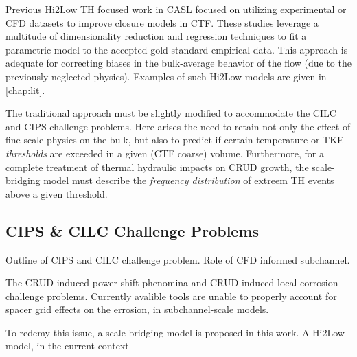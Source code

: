 Previous Hi2Low TH focused work in CASL focused on utilizing experimental or CFD
datasets to improve closure models in CTF.  These studies leverage a multitude of
dimensionality reduction and regression techniques
to fit a parametric model to the accepted gold-standard empirical data.  This approach
is adequate for correcting biases in the bulk-average behavior of the flow (due to
the previously neglected physics).  Examples of such Hi2Low models are given in
\autoref{chap:lit}.

The traditional approach must be slightly modified to accommodate the CILC and
CIPS challenge problems.  Here arises the need to retain not only the effect of
fine-scale physics on the bulk, but also to predict if certain
temperature or TKE \emph{thresholds} are exceeded in a given (CTF coarse)
volume.  Furthermore, for a complete treatment of thermal hydraulic impacts on
CRUD growth, the scale-bridging model must describe the \emph{frequency
distribution} of extreem TH events above a given threshold.

\subsection{CIPS \& CILC Challenge Problems}

Outline of CIPS and CILC challenge problem.  Role of CFD informed subchannel.

The CRUD induced power shift phenomina and CRUD induced local corrosion
challenge problems.  Currently avalible tools are unable to properly account
for spacer grid effects on the errosion, in subchannel-scale models.

To redemy this issue, a scale-bridging model is proposed in this work.  A
Hi2Low model, in the current context 



